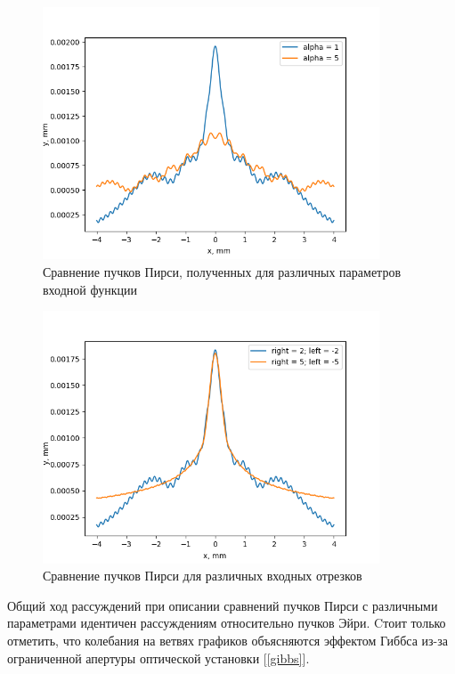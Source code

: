 {    \begin{figure}[H]
        \begin{center}
            \includegraphics[width=10cm]{plots/pe_param_comparison}
            \caption{Сравнение пучков Пирси, полученных для различных параметров входной функции}
            \label{pe_param_comparison}
        \end{center}
    \end{figure}

    \begin{figure}[H]
        \begin{center}
            \includegraphics[width=10cm]{plots/pe_input_comparison}
            \caption{Сравнение пучков Пирси для различных входных отрезков}
            \label{pe_input_comparison}
        \end{center}
    \end{figure}

    Общий ход рассуждений при описании сравнений пучков Пирси с различными
    параметрами идентичен рассуждениям относительно пучков Эйри.
    Cтоит только отметить, что колебания на ветвях графиков объясняются эффектом Гиббса
    из-за ограниченной апертуры оптической установки [\ref{gibbs}].

}
